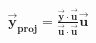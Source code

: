 \documentclass[preview]{standalone}
\begin{document}
\begin{align*}
\mathbf{\vec{y}}_{\textbf{proj}} = \frac{ \mathbf{\vec{y}} \cdot \mathbf{\vec{u}} }{ \mathbf{\vec{u}} \cdot \mathbf{\vec{u}} } \mathbf{\vec{u}}
\end{align*}
\end{document}
